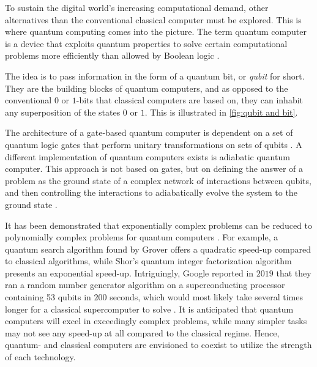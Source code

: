 To sustain the digital world's increasing computational demand, other alternatives than the conventional classical computer must be explored. This is where quantum computing comes into the picture. The term quantum computer is a device that exploits quantum properties to solve certain computational problems more efficiently than allowed by Boolean logic \cite{Weber2010}.

The idea is to pass information in the form of a quantum bit, or \textit{qubit} for short. They are the building blocks of quantum computers, and as opposed to the conventional $0$ or $1$-bits that classical computers are based on, they can inhabit any superposition of the states $0$ or $1$. This is illustrated in \autoref{fig:qubit and bit}.


The architecture of a gate-based quantum computer is dependent on a set of quantum logic gates that perform unitary transformations on sets of qubits \cite{DiVincenzo2000, Ladd2010}. A different implementation of quantum computers exists is adiabatic quantum computer. This approach is not based on gates, but on defining the answer of a problem as the ground state of a complex network of interactions between qubits, and then controlling the interactions to adiabatically evolve the system to the ground state \cite{Mizel2007}.



It has been demonstrated that exponentially complex problems can be reduced to polynomially complex problems for quantum computers \cite{Pavicic2006}. For example, a quantum search algorithm found by Grover \cite{Grover1997} offers a quadratic speed-up compared to classical algorithms, while Shor's quantum integer factorization algorithm \cite{Shor1994} presents an exponential speed-up. Intriguingly, Google reported in $2019$ that they ran a random number generator algorithm on a superconducting processor containing 53 qubits in $200$ seconds, which would most likely take several times longer for a classical supercomputer to solve \cite{Martinis2019}. It is anticipated that quantum computers will excel in exceedingly complex problems, while many simpler tasks may not see any speed-up at all compared to the classical regime. Hence, quantum- and classical computers are envisioned to coexist to utilize the strength of each technology.

